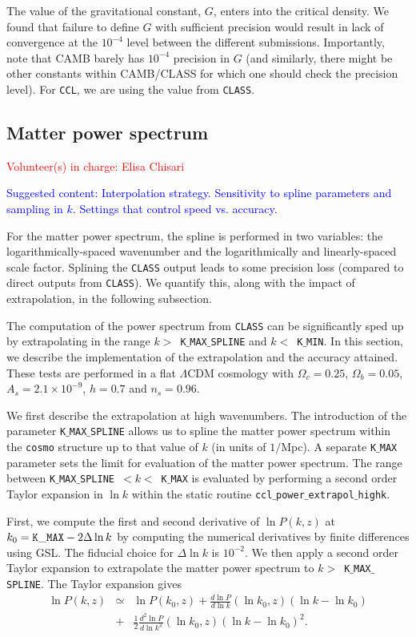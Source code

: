 \documentclass[\docopts]{\docclass}
\newcommand{\vol}[1]{\textcolor{red}{Volunteer(s) in charge: #1}}
\newcommand{\cont}[1]{\textcolor{blue}{Suggested content: #1}}
\newcommand{\ccl}{{\tt CCL}\xspace}
\begin{document}
The value of the gravitational constant, $G$, enters into the critical density. We found that failure to define $G$ with sufficient precision would result in lack of convergence at the $10^{-4}$ level between the different submissions. Importantly, note that CAMB barely has $10^{-4}$ precision in $G$ (and similarly, there might be other constants within CAMB/CLASS for which one should check the precision level). For \ccl, we are using the value from {\tt CLASS}.

\subsection{Matter power spectrum}
\vol{Elisa Chisari}

\cont{Interpolation strategy. Sensitivity to spline parameters and sampling in $k$. Settings that control speed vs. accuracy. }

For the matter power spectrum, the spline is performed in two variables: the logarithmically-spaced wavenumber and the logarithmically and linearly-spaced scale factor. Splining the {\tt CLASS} output leads to some precision loss (compared to direct outputs from {\tt CLASS}). We quantify this, along with the impact of extrapolation, in the following subsection.

The computation of the power spectrum from {\tt CLASS} can be significantly sped up by extrapolating in the range $k>$~{\tt K$\_$MAX$\_$SPLINE} and $k<$~{\tt K$\_$MIN}. In this section, we describe the implementation of the extrapolation and the accuracy attained. These tests are performed in a flat $\Lambda$CDM cosmology with $\Omega_c=0.25$, $\Omega_b=0.05$, $A_s=2.1\times10^{-9}$, $h=0.7$ and $n_s=0.96$.

We first describe the extrapolation at high wavenumbers. The introduction of the parameter {\tt K$\_$MAX$\_$SPLINE} allows us to spline the matter power spectrum within the {\tt cosmo} structure up to that value of $k$ (in units of $1/$Mpc). A separate {\tt K$\_$MAX} parameter sets the limit for evaluation of the matter power spectrum. The range between {\tt K$\_$MAX$\_$SPLINE}~$<k<$~{\tt K$\_$MAX} is evaluated by performing a second order Taylor expansion in $\ln k$ within the static routine {\tt ccl$\_$power$\_$extrapol$\_$highk}.

First, we compute the first and second derivative of $\ln P(k,z)$ at $k_0={\rm \tt K\_MAX}-2\Delta\ln k$ by computing the numerical derivatives by finite differences using GSL. The fiducial choice for $\Delta\ln k$ is $10^{-2}$. We then apply a second order Taylor expansion to extrapolate the matter power spectrum to $k>$~{\tt K$\_$MAX$\_$SPLINE}. The Taylor expansion gives
%
\begin{eqnarray}
  \ln P(k,z) &\simeq& \ln P(k_0,z) + \frac{d\ln P}{d\ln k}(\ln k_0,z) (\ln k-\ln k_0)  \nonumber\\
  &+& \frac{1}{2}  \frac{d^2\ln P}{d\ln k^2}(\ln k_0,z) (\ln k-\ln k_0)^2.
  \label{eq:NLPSTaylor}
\end{eqnarray}
\end{document}
